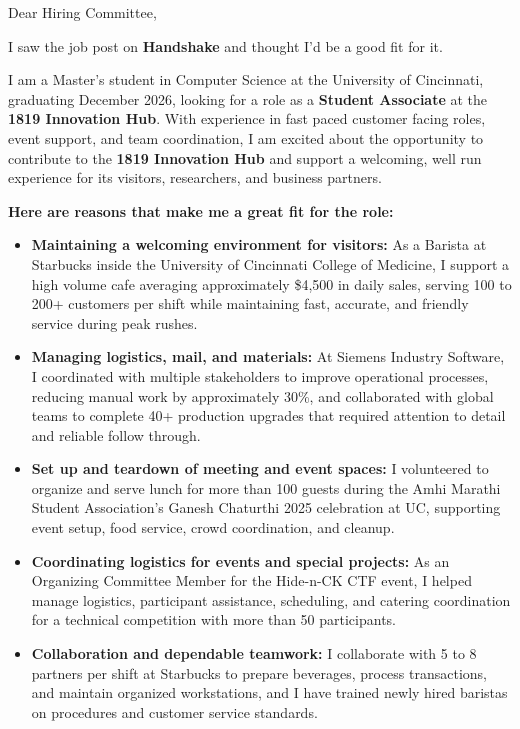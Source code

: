 \documentclass[11pt]{letter}
\date{}
\begin{document}
\begin{letter}{}

\opening{Dear Hiring Committee,}

I saw the job post on \textbf{Handshake} and thought I'd be a good fit for it.

I am a Master's student in Computer Science at the University of Cincinnati, graduating December 2026, looking for a role as a \textbf{Student Associate} at the \textbf{1819 Innovation Hub}. With experience in fast paced customer facing roles, event support, and team coordination, I am excited about the opportunity to contribute to the \textbf{1819 Innovation Hub} and support a welcoming, well run experience for its visitors, researchers, and business partners.

\textbf{Here are reasons that make me a great fit for the role:}

\begin{itemize}[leftmargin=*, itemsep=0.45em]
    \item \textbf{Maintaining a welcoming environment for visitors:} As a Barista at Starbucks inside the University of Cincinnati College of Medicine, I support a high volume cafe averaging approximately \$4,500 in daily sales, serving 100 to 200+ customers per shift while maintaining fast, accurate, and friendly service during peak rushes.

    \item \textbf{Managing logistics, mail, and materials:} At Siemens Industry Software, I coordinated with multiple stakeholders to improve operational processes, reducing manual work by approximately 30\%, and collaborated with global teams to complete 40+ production upgrades that required attention to detail and reliable follow through.

    \item \textbf{Set up and teardown of meeting and event spaces:} I volunteered to organize and serve lunch for more than 100 guests during the Amhi Marathi Student Association's Ganesh Chaturthi 2025 celebration at UC, supporting event setup, food service, crowd coordination, and cleanup.

    \item \textbf{Coordinating logistics for events and special projects:} As an Organizing Committee Member for the Hide-n-CK CTF event, I helped manage logistics, participant assistance, scheduling, and catering coordination for a technical competition with more than 50 participants.

    \item \textbf{Collaboration and dependable teamwork:} I collaborate with 5 to 8 partners per shift at Starbucks to prepare beverages, process transactions, and maintain organized workstations, and I have trained newly hired baristas on procedures and customer service standards.
\end{itemize}


\end{letter}
\end{document}
